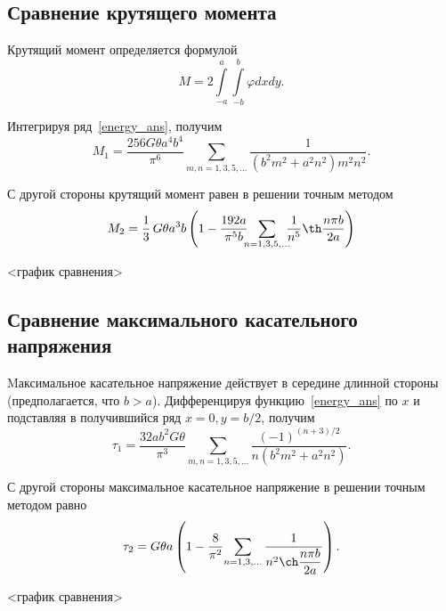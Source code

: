 \documentclass[12pt, a4paper]{article}
\begin{document}
\subsection{Сравнение крутящего момента}
Крутящий момент определяется формулой
\begin{equation}
	\label{torque_com}
	M = 2 \int\limits_{-a}^a \int\limits_{-b}^b \varphi dx dy.
\end{equation}

Интегрируя ряд~\eqref{energy_ans}, получим
\begin{equation}\label{torque_Miclin}
	M_1 = \frac{256 G \theta a^4 b^4} {\pi^6}\!\!\!\sum_{m, n = 1, 3, 5, \ldots}\!\!\!\frac{1}{(b^2 m^2 + a^2 n^2 )m^2 n^2}.
\end{equation}

С другой стороны крутящий момент равен в решении точным методом~\cite{Temochenko75}
\begin{equation}\label{torque_Timoshenko}
	M_2 = \frac{1}{3} \, G \theta a^3 b \left( 1 - \frac{192 a}{\pi^5 b}\!\!\!\sum_{n = 1, 3, 5, \ldots}\!\!\!\frac{1} {n^5} \th\dfrac{n \pi b} {2 a } \right)
\end{equation}

<график сравнения>

\subsection{Сравнение максимального касательного напряжения}
Mаксимальное касательное напряжение действует в середине длинной стороны (предполагается, что $b > a$).
Дифференцируя функцию~\eqref{energy_ans} по $x$ и подставляя в получившийся
ряд $x = 0, y = b/2$, получим
\begin{equation}\label{tau_Michlin}
	\tau_1 = \frac{32 a b^2 G \theta}{\pi^3} \!\!\!\! \sum_{m, n = 1, 3, 5, \ldots}
	\!\!\!\frac{(-1)^{(n+3)/2}} {n( b^2 m^2 + a^2 n^2)}.
\end{equation}

С другой стороны максимальное касательное напряжение в решении точным методом равно~\cite{Temochenko75}
\begin{equation}\label{tau_Timoshenko}
	\tau_2 = G \theta a \left( 1 - \frac{8}{\pi^2}\!
	\sum_{n = 1, 3, \ldots} \frac{1} {n^2 \ch\dfrac{n \pi b} {2a} } \right).
\end{equation}

<график сравнения>


\newpage
\end{document}
